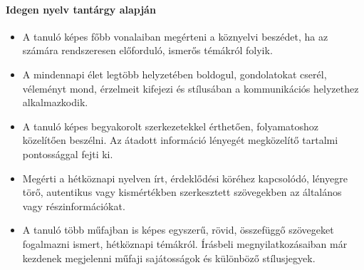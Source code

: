 \paragraph{Idegen nyelv tantárgy alapján}
\begin{itemize}
\item A tanuló képes főbb vonalaiban megérteni a köznyelvi beszédet, ha az számára rendszeresen előforduló, ismerős témákról folyik.
\item A mindennapi élet legtöbb helyzetében boldogul, gondolatokat cserél, véleményt mond, érzelmeit kifejezi és stílusában a kommunikációs helyzethez alkalmazkodik.
\item A tanuló képes begyakorolt szerkezetekkel érthetően, folyamatoshoz közelítően beszélni. Az átadott információ lényegét megközelítő tartalmi pontossággal fejti ki.
\item Megérti a hétköznapi nyelven írt, érdeklődési köréhez kapcsolódó, lényegre törő, autentikus vagy kismértékben szerkesztett szövegekben az általános vagy részinformációkat.
\item A tanuló több műfajban is képes egyszerű, rövid, összefüggő szövegeket fogalmazni ismert, hétköznapi témákról. Írásbeli megnyilatkozásaiban már kezdenek megjelenni műfaji sajátosságok és különböző stílusjegyek.
\end{itemize}
